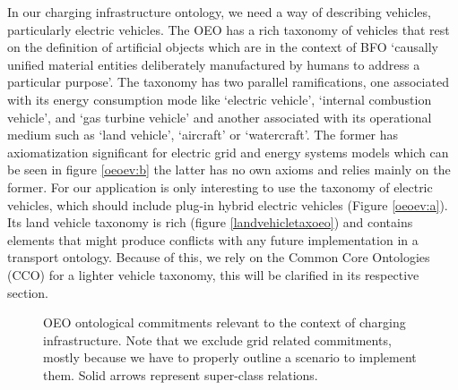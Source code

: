 In our charging infrastructure ontology, we need a way of describing vehicles,
particularly electric vehicles. The OEO has a rich taxonomy of vehicles that
rest on the definition of artificial objects which are in the context of BFO
`causally unified material entities deliberately manufactured by humans to
address a particular purpose'. The taxonomy has two parallel ramifications, one
associated with its energy consumption mode like `electric vehicle', `internal
combustion vehicle', and `gas turbine vehicle' and another associated with its
operational medium such as `land vehicle', `aircraft' or `watercraft'. The
former has axiomatization significant for electric grid and energy systems
models which can be seen in figure \ref{oeoev:b} the latter has no own axioms
and relies mainly on the former. For our application is only interesting to use
the taxonomy of electric vehicles, which should include plug-in hybrid electric
vehicles (Figure \ref{oeoev:a}). Its land vehicle taxonomy is rich (figure
\ref{landvehicletaxoeo}) and contains elements that might produce conflicts with
any future implementation in a transport ontology. Because of this, we rely on
the Common Core Ontologies (CCO) for a lighter vehicle taxonomy, this will be
clarified in its respective section.

\begin{figure}
    \centering
    \caption{OEO ontological commitments relevant to the context of charging infrastructure. Note that we exclude grid related commitments, mostly because we have to properly outline a scenario to implement them. Solid arrows represent super-class relations.}
\end{figure}

